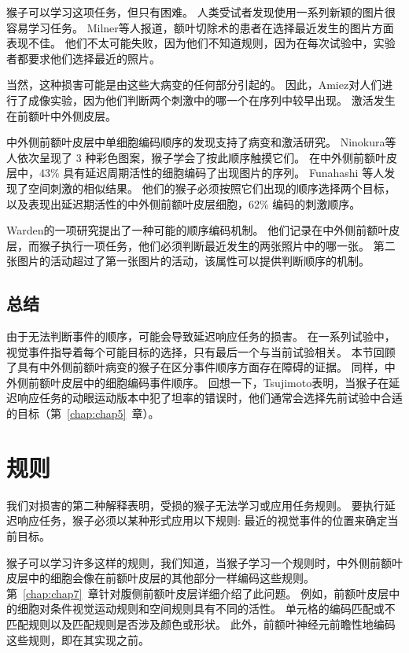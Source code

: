 猴子可以学习这项任务，但只有困难。
人类受试者发现使用一系列新颖的图片很容易学习任务。
Milner等人\cite{milner1985frontal}报道，额叶切除术的患者在选择最近发生的图片方面表现不佳。
他们不太可能失败，因为他们不知道规则，因为在每次试验中，实验者都要求他们选择最近的照片。


当然，这种损害可能是由这些大病变的任何部分引起的。
因此，Amiez\cite{amiez2007selective}对人们进行了成像实验，因为他们判断两个刺激中的哪一个在序列中较早出现。
激活发生在前额叶中外侧皮层。


中外侧前额叶皮层中单细胞编码顺序的发现支持了病变和激活研究。
Ninokura等人\cite{ninokura2003representation}依次呈现了 3 种彩色图案，猴子学会了按此顺序触摸它们。
在中外侧前额叶皮层中，43\% 具有延迟周期活性的细胞编码了出现图片的序列。
Funahashi 等人\cite{funahashi1997delay}发现了空间刺激的相似结果。
他们的猴子必须按照它们出现的顺序选择两个目标，以及表现出延迟期活性的中外侧前额叶皮层细胞，62\% 编码的刺激顺序。


Warden\cite{warden2007representation}的一项研究提出了一种可能的顺序编码机制。
他们记录在中外侧前额叶皮层，而猴子执行一项任务，他们必须判断最近发生的两张照片中的哪一张。
第二张图片的活动超过了第一张图片的活动，该属性可以提供判断顺序的机制。



\subsection{总结}

由于无法判断事件的顺序，可能会导致延迟响应任务的损害。
在一系列试验中，视觉事件指导着每个可能目标的选择，只有最后一个与当前试验相关。
本节回顾了具有中外侧前额叶病变的猴子在区分事件顺序方面存在障碍的证据。
同样，中外侧前额叶皮层中的细胞编码事件顺序。
回想一下，Tsujimoto\cite{tsujimoto2012prefrontal}表明，当猴子在延迟响应任务的动眼运动版本中犯了坦率的错误时，他们通常会选择先前试验中合适的目标（第~\ref{chap:chap5}~章）。



\section{规则}

我们对损害的第二种解释表明，受损的猴子无法学习或应用任务规则。
要执行延迟响应任务，猴子必须以某种形式应用以下规则: 最近的视觉事件的位置来确定当前目标。


猴子可以学习许多这样的规则，我们知道，当猴子学习一个规则时，中外侧前额叶皮层中的细胞会像在前额叶皮层的其他部分一样编码这些规则。
第~\ref{chap:chap7}~章针对腹侧前额叶皮层详细介绍了此问题。
例如，前额叶皮层中的细胞对条件视觉运动规则和空间规则\cite{wise1999role}具有不同的活性。
单元格的编码匹配或不匹配规则\cite{wallis2001single}以及匹配规则是否涉及颜色或形状\cite{mansouri2006prefrontal}。
此外，前额叶神经元前瞻性地编码这些规则，即在其实现之前\cite{wallis2001single}。



